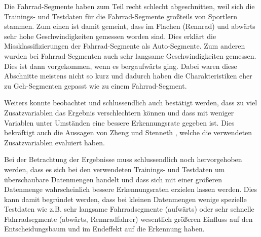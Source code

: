 Die Fahrrad-Segmente haben zum Teil recht schlecht abgeschnitten, weil sich die Trainings- und Testdaten für die Fahrrad-Segmente großteils von Sportlern stammen. Zum einen ist damit gemeint, dass im Flachen (Rennrad) und abwärts sehr hohe Geschwindigkeiten gemessen worden sind. Dies erklärt die Missklassifizierungen der Fahrrad-Segmente als Auto-Segmente. Zum anderen wurden bei Fahrrad-Segmenten auch sehr langsame Geschwindigkeiten gemessen. Dies ist dann vorgekommen, wenn es bergaufwärts ging. Dabei waren diese Abschnitte meistens nicht so kurz und dadurch haben die Charakteristiken eher zu Geh-Segmenten gepasst wie zu einem Fahrrad-Segment.

Weiters konnte beobachtet und schlussendlich auch bestätigt werden, dass zu viel Zusatzvariablen das Ergebnis verschlechtern können und dass mit weniger Variablen unter Umständen eine bessere Erkennungsrate gegeben ist. Dies bekräftigt auch die Aussagen von Zheng \cite{zheng_understanding_2010} und Stenneth \cite{stenneth_transportation_2011}, welche die verwendeten Zusatzvariablen evaluiert haben. 

Bei der Betrachtung der Ergebnisse muss schlussendlich noch hervorgehoben werden, dass es sich bei den verwendeten Trainings- und Testdaten um überschaubare Datenmengen handelt und dass sich mit einer größeren Datenmenge wahrscheinlich bessere Erkennungsraten erzielen lassen werden. Dies kann damit begründet werden, dass bei kleinen Datenmengen wenige spezielle Testdaten wie z.B. sehr langsame Fahrradsegmente (aufwärts) oder sehr schnelle Fahrradsegmente (abwärts, Rennradfahrer) wesentlich größeren Einfluss auf den Entscheidungsbaum und im Endeffekt auf die Erkennung haben. 
